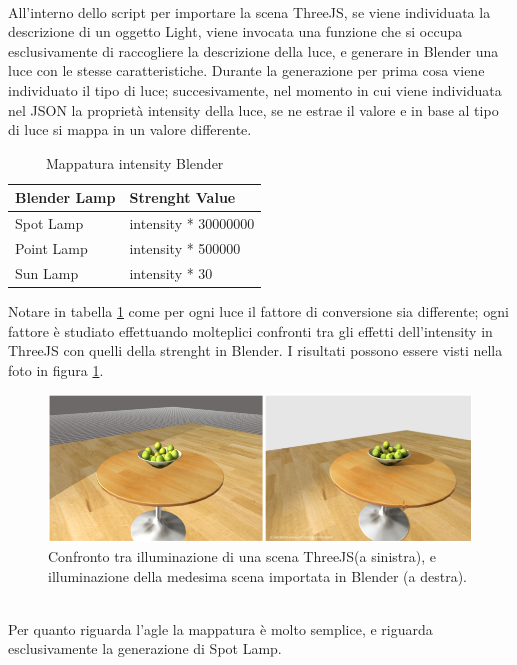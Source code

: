 \\ 
All’interno dello script per importare la scena ThreeJS, se viene individuata la descrizione di un oggetto Light, viene invocata una funzione che si occupa esclusivamente di raccogliere la descrizione della luce, e generare in Blender una luce con le stesse caratteristiche. Durante la generazione per prima cosa viene individuato il tipo di luce; succesivamente, nel momento in cui viene individuata nel JSON la proprietà intensity della luce, se ne estrae il valore e in base al tipo di luce si mappa in un valore differente.
\begin{table}[]
\centering
\caption{Mappatura intensity Blender}
\label{insensity_table}
\begin{tabular}{|l|l|}
\hline
\textbf{Blender Lamp} & \textbf{Strenght Value} \\ \hline
Spot Lamp & intensity * 30000000 \\ \hline
Point Lamp & intensity * 500000 \\ \hline
Sun Lamp & intensity * 30 \\ \hline
\end{tabular}
\end{table}
Notare in tabella \ref{insensity_table} come per ogni luce il fattore di conversione sia differente; ogni fattore è studiato effettuando molteplici confronti tra gli effetti dell’intensity in ThreeJS con quelli della strenght in Blender. I risultati possono essere visti nella foto in figura \ref{fig:ba_se_tavolini}. 
\\
\begin{figure}[htb]
 \centering
 \includegraphics[width=1\linewidth]{images/chapter_baking_service/ba_se_tavolini.png}\hfill
 \caption[Confronto intensity - strenght]{Confronto tra illuminazione di una scena ThreeJS(a sinistra), e illuminazione della medesima scena importata in Blender (a destra).}
 \label{fig:ba_se_tavolini}
\end{figure}
\\
Per quanto riguarda l’agle la mappatura è molto semplice, e riguarda esclusivamente la generazione di Spot Lamp.
